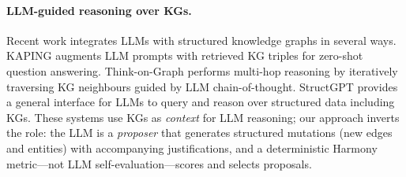 \paragraph{LLM-guided reasoning over KGs.}
Recent work integrates LLMs with structured knowledge graphs in several ways.
KAPING \citep{baek2023kaping} augments LLM prompts with retrieved KG triples for
zero-shot question answering.  Think-on-Graph \citep{sun2024thinkongraph}
performs multi-hop reasoning by iteratively traversing KG neighbours guided by
LLM chain-of-thought.  StructGPT \citep{jiang2023structgpt} provides a general
interface for LLMs to query and reason over structured data including KGs.
These systems use KGs as \emph{context} for LLM reasoning; our approach inverts
the role: the LLM is a \emph{proposer} that generates structured mutations (new
edges and entities) with accompanying justifications, and a deterministic Harmony
metric---not LLM self-evaluation---scores and selects proposals.
